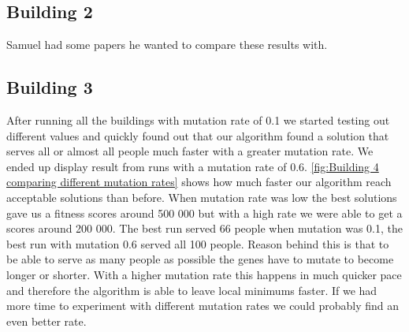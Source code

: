 \subsection{Building 2}
Samuel had some papers he wanted to compare these results with.

\subsection{Building 3}

After running all the buildings with mutation rate of 0.1 we started testing out different values and quickly found out that our algorithm found a solution that serves all or almost all people much faster with a greater mutation rate. We ended up display result from runs with a mutation rate of 0.6. \ref{fig:Building 4 comparing different mutation rates} shows how much faster our algorithm reach acceptable solutions than before. When mutation rate was low the best solutions gave us a fitness scores around 500 000 but with a high rate we were able to get a scores around 200 000. The best run served 66 people when mutation was 0.1, the best run with mutation 0.6 served all 100 people. Reason behind this is that to be able to serve as many people as possible the genes have to mutate to become longer or shorter. With a higher mutation rate this happens in much quicker pace and therefore the algorithm is able to leave local minimums faster. If we had more time to experiment with different mutation rates we could probably find an even better rate.

